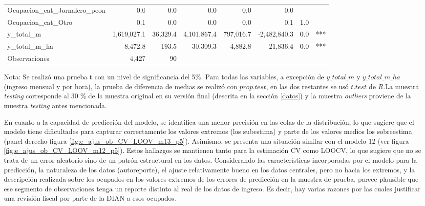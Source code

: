 \documentclass[12pt,a4paper,onecolumn]{article}
\begin{document}
\begin{table}[ht]
{\begin{tabular}{lrrrrrrl}
  Ocupacion\_cat\_Jornalero\_peon & 0.0 & 0.0 & 0.0 & 0.0 & 0.0 &  &  \\ 
  Ocupacion\_cat\_Otro & 0.1 & 0.0 & 0.0 & 0.0 & 0.1 & 1.0 &  \\ 
  y\_total\_m & 1,619,027.1 & 36,329.4 & 4,101,867.4 & 797,016.7 & -2,482,840.3 & 0.0 & *** \\ 
  y\_total\_m\_ha & 8,472.8 & 193.5 & 30,309.3 & 4,882.8 & -21,836.4 & 0.0 & *** \\ 
   \hline
    \hline
Observaciones & 4,427 & 90 &  &  &  &  &  \\ 
   \hline
\end{tabular}
}
\begin{minipage}{16cm}
\tiny Nota: Se realizó una prueba t con un nivel de significancia del 5\%. Para todas las variables, a excepción de $y\_total\_m$ y $y\_total\_m\_ha$ (ingreso mensual y por hora), la prueba de diferencia de medias se realizó con $prop.test$, en las dos restantes se usó $t.test$ de $R$.La muestra \textit{testing} corresponde al 30 \% de la muestra original en su versión final (descrita en la sección \ref{datos}) y la muestra \textit{outliers} proviene de la muestra \textit{testing} antes mencionada. 
\end{minipage}
\end{table}

En cuanto a la capacidad de predicción del modelo, se identifica una menor precisión en las colas de la distribución, lo que sugiere que el modelo tiene dificultades para capturar correctamente los valores extremos (los subestima) y parte de los valores medios los sobreestima (panel derecho figura \ref{fig:e_ajus_ob_CV_LOOV_m13_p5}). Asimismo, se presenta una situación similar con el modelo 12 (ver figura \ref{fig:e_ajus_ob_CV_LOOV_m12_p5}). Estos hallazgos se mantienen tanto para la estimación CV como LOOCV, lo que sugiere que no se trata de un error aleatorio sino de un patrón estructural en los datos. 
\bigbreak
Considerando las características incorporadas por el modelo para la predicción, la naturaleza de los datos (autoreporte), el ajuste relativamente bueno en los datos centrales, pero no hacia los extremos, y la descripción realizada sobre los ocupados en los valores extremos de los errores de predicción en la muestra de prueba, parece plausible que ese segmento de observaciones tenga un reporte distinto al real de los datos de ingreso. Es decir, hay varias razones por las cuales justificar una revisión fiscal por parte de la DIAN a esos ocupados. 
\bigbreak
\end{document}
